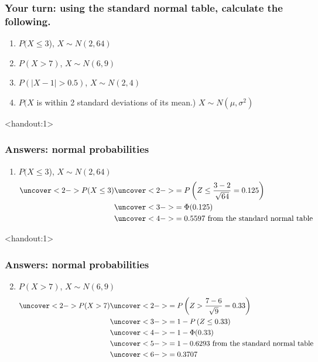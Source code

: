 \documentclass[handout]{beamer}\usepackage[]{graphicx}\usepackage[]{color}
\newcommand{\answers}{1}
\numberwithin{equation}{section}
\begin{document}
\begin{frame}
\frametitle{Your turn: using the standard normal table, calculate the following.}
\begin{enumerate}[1. ]
\item $P(X \le 3$), $X \sim N(2,64) $
\item $P(X > 7 )$, $X \sim N(6, 9)$
\item $P(|X-1| > 0.5)$, $X \sim N(2,4)$
\item $P(X$ is within 2 standard deviations of its mean.) $X \sim N(\mu, \sigma^2)$
\end{enumerate}
\end{frame}



\begin{frame}<handout:\answers>
\frametitle{Answers: normal probabilities} \scriptsize
\begin{enumerate}[1. ]
\item $P(X \le 3$), $X \sim N(2,64) $
 \begin{align*}
\uncover<2->{P(X \le 3)} & \uncover<2->{= P \left (Z \le \frac{3-2}{\sqrt{64}} = 0.125 \right)} \\
&\uncover<3->{= \Phi(0.125)} \\
&\uncover<4->{= 0.5597 \text{ from the standard normal table}}
\end{align*}
\end{enumerate} 
\end{frame}


\begin{frame}<handout:\answers>
\frametitle{Answers: normal probabilities} \scriptsize
\begin{enumerate}
\setcounter{enumi}{1}
\item  $P(X > 7 )$, $X \sim N(6, 9)$
\begin{align*}
\uncover<2->{P(X > 7)} & \uncover<2->{= P \left ( Z > \frac{7-6}{\sqrt{9}} = 0.33 \right )} \\
&\uncover<3->{= 1- P \left (Z \le 0.33 \right )} \\
&\uncover<4->{= 1 - \Phi(0.33)} \\ 
&\uncover<5->{= 1 - 0.6293 \text{ from the standard normal table}} \\
&\uncover<6->{= 0.3707}
\end{align*}
\end{enumerate}
\end{frame}
\end{document}
